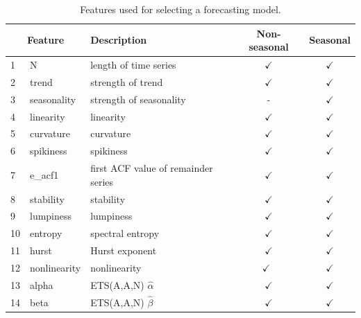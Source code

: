 \documentclass[11pt,a4paper,]{article}
\theoremstyle{definition}
\theoremstyle{definition}
\theoremstyle{definition}
\theoremstyle{remark}
\begin{document}
\begin{table}[!htp]
\centering\footnotesize\tabcolsep=0.12cm
\def\yes{$\checkmark$}
\caption{Features used for selecting a forecasting model.}
\label{feature}
\begin{tabular}{llp{}cc}
\toprule
\multicolumn{2}{c}{Feature} & Description & Non-seasonal & Seasonal\\ 
\midrule
1  & N              & length of time series                                                                   & \yes  & \yes \\
2  & trend          & strength of trend                                                                       & \yes  & \yes\\
3  & seasonality       & strength of seasonality                                                                 & -     & \yes \\
4  & linearity      & linearity                                                                               & \yes  & \yes \\
5  & curvature      & curvature                                                                               & \yes  & \yes \\
6  & spikiness      & spikiness                                                                               & \yes  & \yes \\
7  & e\_acf1        & first ACF value of remainder series                                                     & \yes  & \yes \\
8  & stability      & stability                                                                               & \yes  & \yes \\
9  & lumpiness      & lumpiness                                                                               & \yes  & \yes \\
10 & entropy        & spectral entropy                                                                        & \yes  & \yes \\
11 & hurst          & Hurst exponent                                                                          & \yes  & \yes \\
12 & nonlinearity   & nonlinearity                                                                            & \yes\ & \yes \\
13 & alpha          & ETS(A,A,N) $\hat\alpha$                                                                 & \yes  & \yes \\
14 & beta           & ETS(A,A,N) $\hat\beta$                                                                  & \yes  & \yes\\

\end{tabular}
\end{table}
\end{document}
